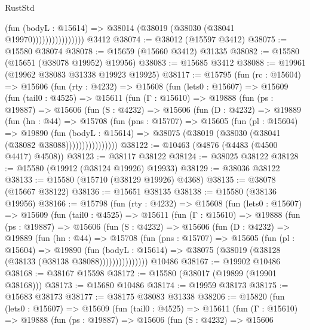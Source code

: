 \begin{lexlean}{RustStd}
\begin{coremodule}
                            (fun (bodyL : @15614) =>
                            @38014 (@38019 (@38030 (@38041 @19970))))))))))))))))
    @3412
@38074 := @38012 (@15597 @3412)
@38075 := @15580 @38074
@38078 := @15659 (@15660 @3412) @31335
@38082 := @15580 (@15651 (@38078 @19952) @19956)
@38083 := @15685 @3412
@38088 := @19961 (@19962 @38083 @31338 @19923 @19925)
@38117 := @15795
    (fun (rc : @15604) =>
    @15606
      (fun (rty : @4232) =>
      @15608
        (fun (lets0 : @15607) =>
        @15609
          (fun (tail0 : @4525) =>
          @15611
            (fun (Γ : @15610) =>
            @19888
              (fun (ps : @19887) =>
              @15606
                (fun (S : @4232) =>
                @15606
                  (fun (D : @4232) =>
                  @19889
                    (fun (hn : @44) =>
                    @15708
                      (fun (pns : @15707) =>
                      @15605
                        (fun (pl : @15604) =>
                        @19890
                          (fun (bodyL : @15614) =>
                          @38075 (@38019 (@38030 (@38041 (@38082 @38088))))))))))))))))
@38122 := @10463 (@4876 (@4483 (@4500 @4417) @4508))
@38123 := @38117 @38122
@38124 := @38025 @38122
@38128 := @15580 (@19912 (@38124 @19926) @19933)
@38129 := @38036 @38122
@38133 := @15580 (@15710 (@38129 @19926) @4368)
@38135 := @38078 (@15667 @38122)
@38136 := @15651 @38135
@38138 := @15580 (@38136 @19956)
@38166 := @15798
    (fun (rty : @4232) =>
    @15608
      (fun (lets0 : @15607) =>
      @15609
        (fun (tail0 : @4525) =>
        @15611
          (fun (Γ : @15610) =>
          @19888
            (fun (ps : @19887) =>
            @15606
              (fun (S : @4232) =>
              @15606
                (fun (D : @4232) =>
                @19889
                  (fun (hn : @44) =>
                  @15708
                    (fun (pns : @15707) =>
                    @15605
                      (fun (pl : @15604) =>
                      @19890
                        (fun (bodyL : @15614) =>
                        @38075 (@38019 (@38128 (@38133 (@38138 @38088)))))))))))))))
    @10486
@38167 := @19902 @10486
@38168 := @38167 @15598
@38172 := @15580 (@38017 (@19899 (@19901 @38168)))
@38173 := @15680 @10486
@38174 := @19959 @38173
@38175 := @15683 @38173
@38177 := @38175 @38083 @31338
@38206 := @15820
    (fun (lets0 : @15607) =>
    @15609
      (fun (tail0 : @4525) =>
      @15611
        (fun (Γ : @15610) =>
        @19888
          (fun (ps : @19887) =>
          @15606
            (fun (S : @4232) =>
            @15606

\end{coremodule}
\end{lexlean}
